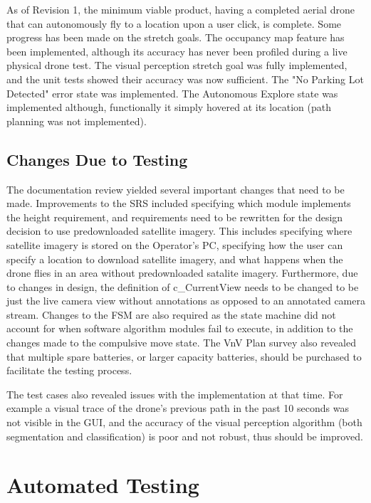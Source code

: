 \documentclass[12pt, titlepage]{article}
\begin{document}
As of Revision 1, the minimum viable product, having a completed aerial drone that can autonomously fly to a location upon a user click, is complete. Some progress has been made on the stretch goals. The occupancy map feature has been implemented, although its accuracy has never been profiled during a live physical drone test. The visual perception stretch goal was fully implemented, and the unit tests showed their accuracy was now sufficient. The "No Parking Lot Detected" error state was implemented. The Autonomous Explore state was implemented although, functionally it simply hovered at its location (path planning was not implemented). 

\subsection{Changes Due to Testing}
\label{subsec:changesFromTesting}

The documentation review yielded several important changes that need to be made. Improvements to the SRS included specifying which module implements the height requirement, and requirements need to be rewritten for the design decision to use predownloaded satellite imagery. This includes specifying where satellite imagery is stored on the Operator's PC, specifying how the user can specify a location to download satellite imagery, and what happens when the drone flies in an area without predownloaded satalite imagery. Furthermore, due to changes in design, the definition of c\_CurrentView needs to be changed to be just the live camera view without annotations as opposed to an annotated camera stream. Changes to the FSM are also required as the state machine did not account for when software algorithm modules fail to execute, in addition to the changes made to the compulsive move state. The VnV Plan survey also revealed that multiple spare batteries, or larger capacity batteries, should be purchased to facilitate the testing process.

The test cases also revealed issues with the implementation at that time. For example a visual trace of the drone's previous path in the past 10 seconds was not visible in the GUI, and the accuracy of the visual perception algorithm (both segmentation and classification) is poor and not robust, thus should be improved.

\section{Automated Testing}
\end{document}
